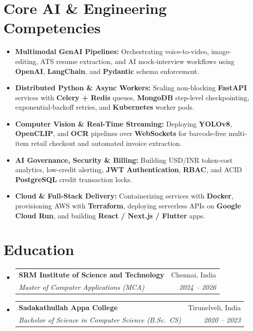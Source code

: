 \documentclass[letterpaper,10pt]{article}
\makeatletter
\newcommand{\resumeItem}[1]{
  \item\small{
    {#1 \vspace{-1pt}}
  }
}
\newcommand{\resumeSubheading}[4]{
  \vspace{-2pt}\item
    \begin{tabular*}{1.0\textwidth}[t]{l@{\extracolsep{\fill}}r}
      \textbf{#1} & #2 \\
      \textit{\small#3} & \textit{\small #4} \\
    \end{tabular*}\vspace{-6pt}
}
\newcommand{\resumeSubHeadingListStart}{\begin{itemize}[leftmargin=0.0in, label={}]}
\newcommand{\resumeSubHeadingListEnd}{\end{itemize}}
\makeatother
\begin{document}
\section{Core AI \& Engineering Competencies}
  \begin{itemize}[leftmargin=0.16in, itemsep=2.5pt, parsep=0pt, topsep=3pt]
    \resumeItem{\textbf{Multimodal GenAI Pipelines:} Orchestrating voice-to-video, image-editing, ATS resume extraction, and AI mock-interview workflows using \textbf{OpenAI}, \textbf{LangChain}, and \textbf{Pydantic} schema enforcement.}
    \resumeItem{\textbf{Distributed Python \& Async Workers:} Scaling non-blocking \textbf{FastAPI} services with \textbf{Celery + Redis} queues, \textbf{MongoDB} step-level checkpointing, exponential-backoff retries, and \textbf{Kubernetes} worker pods.}
    \resumeItem{\textbf{Computer Vision \& Real-Time Streaming:} Deploying \textbf{YOLOv8}, \textbf{OpenCLIP}, and \textbf{OCR} pipelines over \textbf{WebSockets} for barcode-free multi-item retail checkout and automated invoice extraction.}
    \resumeItem{\textbf{AI Governance, Security \& Billing:} Building USD/INR token-cost analytics, low-credit alerting, \textbf{JWT Authentication}, \textbf{RBAC}, and ACID \textbf{PostgreSQL} credit transaction locks.}
    \resumeItem{\textbf{Cloud \& Full-Stack Delivery:} Containerizing services with \textbf{Docker}, provisioning AWS with \textbf{Terraform}, deploying serverless APIs on \textbf{Google Cloud Run}, and building \textbf{React / Next.js / Flutter} apps.}
  \end{itemize}
  \vspace{2pt}

\section{Education}
  \resumeSubHeadingListStart
    \resumeSubheading
      {SRM Institute of Science and Technology}{Chennai, India}
      {Master of Computer Applications (MCA)}{2024 -- 2026}
    \resumeSubheading
      {Sadakathullah Appa College}{Tirunelveli, India}
      {Bachelor of Science in Computer Science (B.Sc.\ CS)}{2020 -- 2023}
  \resumeSubHeadingListEnd

\end{document}
